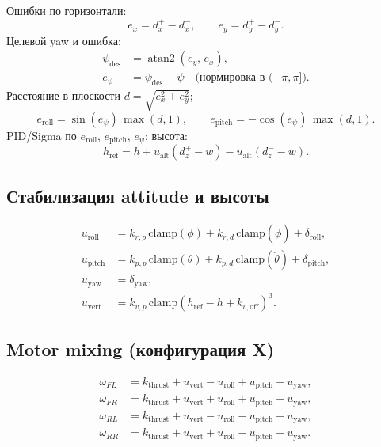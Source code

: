 \documentclass[a4paper,11pt]{article}
\begin{document}
Ошибки по горизонтали:
\begin{equation}
  e_x = d_x^+ - d_x^-,\qquad e_y = d_y^+ - d_y^-.
\end{equation}
Целевой yaw и ошибка:
\begin{align}
  \psi_{\mathrm{des}} &= \operatorname{atan2}(e_y,\, e_x), \label{eq:target_yaw}\\
  e_\psi &= \psi_{\mathrm{des}} - \psi \quad \text{(нормировка в $(-\pi,\pi]$)}.
\end{align}
Расстояние в плоскости $d = \sqrt{e_x^2 + e_y^2}$;
\begin{equation}
  e_{\mathrm{roll}} = \sin(e_\psi)\,\max(d, 1),\qquad
  e_{\mathrm{pitch}} = -\cos(e_\psi)\,\max(d, 1).
\end{equation}
PID/Sigma по $e_{\mathrm{roll}}$, $e_{\mathrm{pitch}}$, $e_\psi$;
высота:
\begin{equation}
  h_{\mathrm{ref}} = h + u_{\mathrm{alt}}(d_z^+ - w) - u_{\mathrm{alt}}(d_z^- - w).
\end{equation}

\subsection{Стабилизация attitude и высоты}

\begin{align}
  u_{\mathrm{roll}} &= k_{r,p}\,\mathrm{clamp}(\phi)
  + k_{r,d}\,\mathrm{clamp}(\dot\phi) + \delta_{\mathrm{roll}}, \label{eq:mavic_roll}\\
  u_{\mathrm{pitch}} &= k_{p,p}\,\mathrm{clamp}(\theta)
  + k_{p,d}\,\mathrm{clamp}(\dot\theta) + \delta_{\mathrm{pitch}}, \label{eq:mavic_pitch}\\
  u_{\mathrm{yaw}} &= \delta_{\mathrm{yaw}}, \label{eq:mavic_yaw}\\
  u_{\mathrm{vert}} &= k_{v,p}\,\mathrm{clamp}(h_{\mathrm{ref}} - h + k_{v,\mathrm{off}})^3.
  \label{eq:mavic_vert}
\end{align}

\subsection{Motor mixing (конфигурация X)}

\begin{align}
  \omega_{FL} &= k_{\mathrm{thrust}} + u_{\mathrm{vert}} - u_{\mathrm{roll}} + u_{\mathrm{pitch}} - u_{\mathrm{yaw}}, \nonumber\\
  \omega_{FR} &= k_{\mathrm{thrust}} + u_{\mathrm{vert}} + u_{\mathrm{roll}} + u_{\mathrm{pitch}} + u_{\mathrm{yaw}}, \nonumber\\
  \omega_{RL} &= k_{\mathrm{thrust}} + u_{\mathrm{vert}} - u_{\mathrm{roll}} - u_{\mathrm{pitch}} + u_{\mathrm{yaw}}, \nonumber\\
  \omega_{RR} &= k_{\mathrm{thrust}} + u_{\mathrm{vert}} + u_{\mathrm{roll}} - u_{\mathrm{pitch}} - u_{\mathrm{yaw}}.
  \label{eq:mavic_mix}
\end{align}
\end{document}
